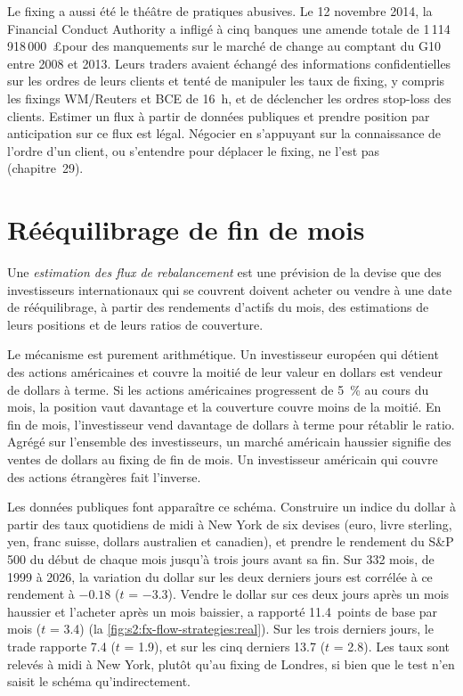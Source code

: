 Le fixing a aussi été le théâtre de pratiques abusives. Le 12 novembre 2014, la Financial Conduct Authority a infligé à cinq banques une amende totale de 1\,114\,918\,000~\pounds pour
des manquements sur le marché de change au comptant du G10 entre 2008 et 2013. Leurs traders avaient échangé des informations confidentielles sur les ordres de leurs clients et tenté de manipuler
les taux de fixing, y compris les fixings WM/Reuters et BCE de 16~h, et de déclencher les ordres stop-loss des clients. Estimer un flux à partir de données publiques et prendre position
par anticipation sur ce flux est légal. Négocier en s'appuyant sur la connaissance de l'ordre d'un client, ou s'entendre pour déplacer le fixing, ne l'est pas (chapitre~29).

\section{Rééquilibrage de fin de mois}

\begin{definition}\label{def:s2:fx-flow-strategies:estimate}
Une \emph{estimation des flux de rebalancement} est une prévision de la devise que des investisseurs internationaux qui se couvrent doivent acheter ou
vendre à une date de rééquilibrage, à partir des rendements d'actifs du mois, des estimations de leurs positions et de leurs ratios de couverture.
\end{definition}

Le mécanisme est purement arithmétique. Un investisseur européen qui détient des actions américaines et couvre la moitié de leur valeur en dollars est vendeur de dollars à terme. Si les actions américaines
progressent de 5~\% au cours du mois, la position vaut davantage et la couverture couvre moins de la moitié. En fin de mois, l'investisseur vend davantage de dollars à terme pour rétablir
le ratio. Agrégé sur l'ensemble des investisseurs, un marché américain haussier signifie des ventes de dollars au fixing de fin de mois. Un investisseur américain qui couvre des actions étrangères fait l'inverse.

Les données publiques font apparaître ce schéma. Construire un indice du dollar à partir des taux quotidiens de midi à New York de six devises (euro, livre sterling, yen, franc suisse, dollars australien et
canadien), et prendre le rendement du S\&P 500 du début de chaque mois jusqu'à trois jours avant sa fin. Sur 332 mois, de 1999 à 2026, la
variation du dollar sur les deux derniers jours est corrélée à ce rendement à $-0.18$ ($t$ = $-3.3$). Vendre le dollar sur ces deux jours après un mois haussier
et l'acheter après un mois baissier, a rapporté 11.4~points de base par mois ($t$ = 3.4)
(la \cref{fig:s2:fx-flow-strategies:real}). Sur les trois derniers jours, le trade rapporte 7.4 ($t$ = 1.9), et sur les cinq derniers 13.7 ($t$ = 2.8). Les taux
sont relevés à midi à New York, plutôt qu'au fixing de Londres, si bien que le test n'en saisit le schéma qu'indirectement.

